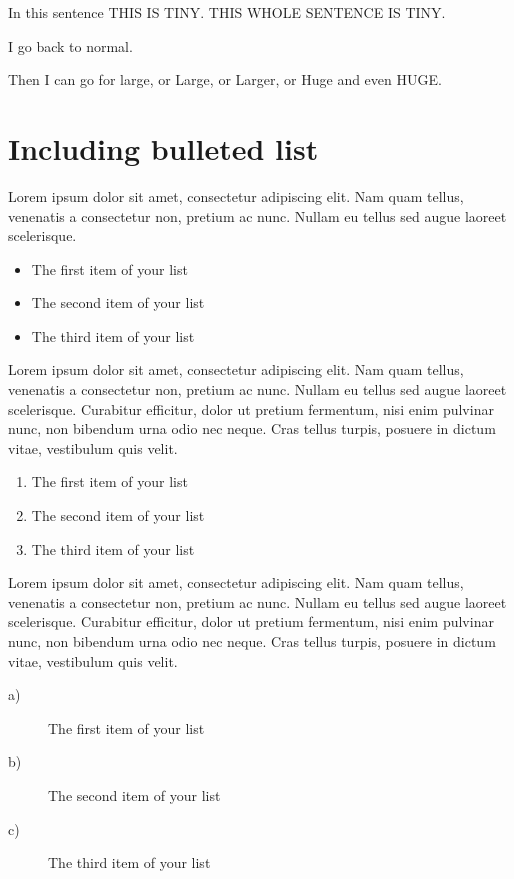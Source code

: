 In this sentence {\tiny{THIS IS TINY}}.
\tiny THIS WHOLE SENTENCE IS TINY.

\normalsize I go back to normal.

Then I can go for {\large{large}}, or {\Large{Large}}, or {\LARGE{Larger}}, or {\huge{Huge}} and even {\Huge{HUGE}}.

\section{Including bulleted list}
Lorem ipsum dolor sit amet, consectetur adipiscing elit. Nam quam tellus, venenatis a consectetur non, pretium ac nunc. Nullam eu tellus sed augue laoreet scelerisque. 

\begin{itemize}
    \item The first item of your list
    \item The second item of your list
    \item The third item of your list
\end{itemize}

Lorem ipsum dolor sit amet, consectetur adipiscing elit. Nam quam tellus, venenatis a consectetur non, pretium ac nunc. Nullam eu tellus sed augue laoreet scelerisque. Curabitur efficitur, dolor ut pretium fermentum, nisi enim pulvinar nunc, non bibendum urna odio nec neque. Cras tellus turpis, posuere in dictum vitae, vestibulum quis velit.

\begin{enumerate}
    \item The first item of your list
    \item The second item of your list
    \item The third item of your list
\end{enumerate}

Lorem ipsum dolor sit amet, consectetur adipiscing elit. Nam quam tellus, venenatis a consectetur non, pretium ac nunc. Nullam eu tellus sed augue laoreet scelerisque. Curabitur efficitur, dolor ut pretium fermentum, nisi enim pulvinar nunc, non bibendum urna odio nec neque. Cras tellus turpis, posuere in dictum vitae, vestibulum quis velit. 

\begin{description}
    \item[a)] The first item of your list
    \item[b)] The second item of your list
    \item[c)] The third item of your list
\end{description}
 

